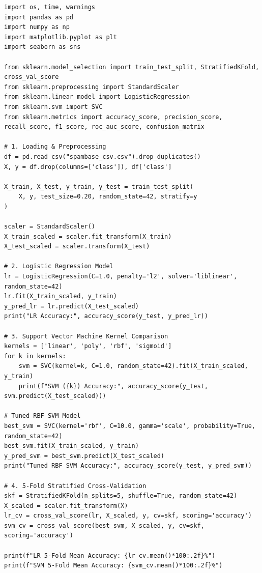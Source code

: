\documentclass[12pt,a4paper]{article}
\begin{document}
\begin{lstlisting}[caption={Complete Binary Classification Pipeline (Logistic Regression \& SVM)}]
import os, time, warnings
import pandas as pd
import numpy as np
import matplotlib.pyplot as plt
import seaborn as sns

from sklearn.model_selection import train_test_split, StratifiedKFold, cross_val_score
from sklearn.preprocessing import StandardScaler
from sklearn.linear_model import LogisticRegression
from sklearn.svm import SVC
from sklearn.metrics import accuracy_score, precision_score, recall_score, f1_score, roc_auc_score, confusion_matrix

# 1. Loading & Preprocessing
df = pd.read_csv("spambase_csv.csv").drop_duplicates()
X, y = df.drop(columns=['class']), df['class']

X_train, X_test, y_train, y_test = train_test_split(
    X, y, test_size=0.20, random_state=42, stratify=y
)

scaler = StandardScaler()
X_train_scaled = scaler.fit_transform(X_train)
X_test_scaled = scaler.transform(X_test)

# 2. Logistic Regression Model
lr = LogisticRegression(C=1.0, penalty='l2', solver='liblinear', random_state=42)
lr.fit(X_train_scaled, y_train)
y_pred_lr = lr.predict(X_test_scaled)
print("LR Accuracy:", accuracy_score(y_test, y_pred_lr))

# 3. Support Vector Machine Kernel Comparison
kernels = ['linear', 'poly', 'rbf', 'sigmoid']
for k in kernels:
    svm = SVC(kernel=k, C=1.0, random_state=42).fit(X_train_scaled, y_train)
    print(f"SVM ({k}) Accuracy:", accuracy_score(y_test, svm.predict(X_test_scaled)))

# Tuned RBF SVM Model
best_svm = SVC(kernel='rbf', C=10.0, gamma='scale', probability=True, random_state=42)
best_svm.fit(X_train_scaled, y_train)
y_pred_svm = best_svm.predict(X_test_scaled)
print("Tuned RBF SVM Accuracy:", accuracy_score(y_test, y_pred_svm))

# 4. 5-Fold Stratified Cross-Validation
skf = StratifiedKFold(n_splits=5, shuffle=True, random_state=42)
X_scaled = scaler.fit_transform(X)
lr_cv = cross_val_score(lr, X_scaled, y, cv=skf, scoring='accuracy')
svm_cv = cross_val_score(best_svm, X_scaled, y, cv=skf, scoring='accuracy')

print(f"LR 5-Fold Mean Accuracy: {lr_cv.mean()*100:.2f}%")
print(f"SVM 5-Fold Mean Accuracy: {svm_cv.mean()*100:.2f}%")
\end{lstlisting}
\end{document}
